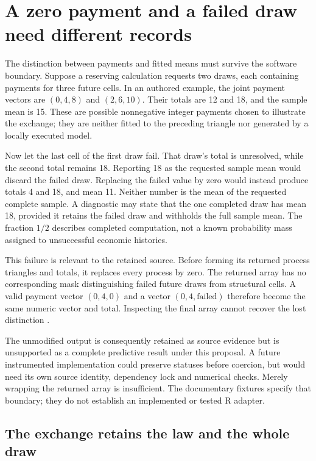 \section{A zero payment and a failed draw need different records}
\label{sec:reserving-adapter}

The distinction between payments and fitted means must survive the software
boundary. Suppose a reserving calculation requests two draws, each containing
payments for three future cells. In an authored example, the joint payment
vectors are $(0,4,8)$ and $(2,6,10)$. Their totals are 12 and 18, and the
sample mean is 15. These are possible nonnegative integer payments chosen
to illustrate the exchange; they are neither fitted to the preceding triangle
nor generated by a locally executed model.

Now let the last cell of the first draw fail. That draw's total is unresolved,
while the second total remains 18. Reporting 18 as the requested sample mean
would discard the failed draw. Replacing the failed value by zero would instead
produce totals 4 and 18, and mean 11. Neither number is the mean of the
requested complete sample. A diagnostic may state that the one completed
draw has mean 18, provided it retains the failed draw and withholds the full
sample mean. The fraction $1/2$ describes completed computation, not a known
probability mass assigned to unsuccessful economic histories.

This failure is relevant to the retained  source. Before
forming its returned process triangles and totals, it replaces every process
 by zero. The returned array has no corresponding mask distinguishing
failed future draws from structural cells. A valid payment vector $(0,4,0)$
and a vector $(0,4,\text{failed})$ therefore become the same numeric vector
and total. Inspecting the final array cannot recover the lost distinction
\citep[, process-triangle coercion and returned fields]{chainladder2023snapshot}.

The unmodified output is consequently retained as source evidence but is
unsupported as a complete predictive result under this proposal. A future
instrumented implementation could preserve statuses before coercion, but
would need its own source identity, dependency lock and numerical checks.
Merely wrapping the returned array is insufficient. The documentary fixtures
specify that boundary; they do not establish an implemented or tested R adapter.

\subsection{The exchange retains the law and the whole draw}

